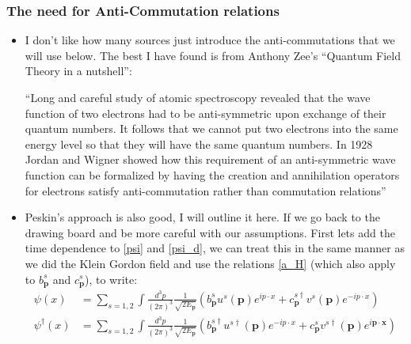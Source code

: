 \documentclass[11pt]{article}
\numberwithin{equation}{section}
\begin{document}
\subsubsection{The need for Anti-Commutation relations}{\label{need_anti}}
\begin{itemize}
  \item I don't like how many sources just introduce the anti-commutations that we will use below. The best I have found is from Anthony Zee's ``Quantum Field Theory in a nutshell'': 

  ``Long and careful study of atomic spectroscopy revealed that the wave function of two electrons had to be anti-symmetric upon exchange of their quantum numbers. It follows that we cannot put two electrons into the same energy level so that they will have the same quantum numbers. In 1928 Jordan and Wigner showed how this requirement of an anti-symmetric wave function can be formalized by having the creation and annihilation operators for electrons satisfy anti-commutation rather than commutation relations''

\item Peskin's  approach is also good, I will outline it here. If we go back to the drawing board and be more careful with our assumptions. First lets add the time dependence to \ref{psi} and \ref{psi_d}, we can treat this in the same manner as we did the Klein Gordon field and use the relations \ref{a_H} (which also apply to $b^{s}_{\textbf{p}}$ and $c^{s}_{\textbf{p}}$), to write: 
\begin{align}
\label{psi_dag}
      \psi(x) &= \sum_{s=1,2}\int \frac{d^3p}{(2\pi)^3}\frac{1}{\sqrt{2E_{\textbf{p}}}}\left(b^{s}_{\textbf{p}}u^s(\textbf{p})e^{ip\cdot x}+c^{s \dagger}_{\textbf{p}}v^s(\textbf{p})e^{-ip\cdot x}\right)  \\
      \psi^{\dagger}(x) &= \sum_{s=1,2}\int \frac{d^3p}{(2\pi)^3}\frac{1}{\sqrt{2E_{\textbf{p}}}}\left(b^{s \dagger}_{\textbf{p}}u^{s\dagger}(\textbf{p})e^{-ip\cdot x}+c^{s }_{\textbf{p}}v^{s\dagger}(\textbf{p})e^{i\textbf{p}\cdot\textbf{x}}\right)
 \end{align} 


\end{itemize}
\end{document}
